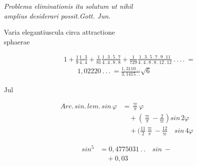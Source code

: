 \clearpage{}\NoSourceHead
\begingroup\fontsize{10}{15}\selectfont\itshape
\noindent Problema eliminationis ita solutum ut nihil\\
\hspace*{2em}amplius desiderari possit.\hfill Gott. Jun.

\medskip
\noindent Varia elegantiuscula circa attractione\\
\hspace*{2em}sphaerae

\medskip
\[
\begin{aligned}
&1+\frac19\frac{1\,.\,3}{4\,.\,4}+\frac1{81}\frac{1\,.\,3\,.\,5\,.\,7}{4\,.\,4\,.\,8\,.\,8}
+\frac1{729}\frac{1\,.\,3\,.\,5\,.\,7\,.\,9\,.\,11}{4\,.\,4\,.\,8\,.\,8\,.\,12\,.\,12}\ .\,.\,.\,.\ =\\
&\qquad1{,}02220\ .\,.\,.\ =\frac{1{,}3110\ .\,.}{3{,}1415\ .\,.}\surd6
\end{aligned}
\]
\par\noindent\hfill Jul

\medskip
\[
\begin{aligned}
\mathit{Arc.\,sin.\,lem.}\,\mathit{sin}\,\varphi
&=\frac\varpi\pi\varphi\\
&\quad+\left(\frac\varpi\pi-\frac2\varpi\right)\mathit{sin}\,2\varphi\\
&\quad+\biggl(\frac{11}2\frac\varpi\pi-\frac{12}\varpi\quad\mathit{sin}\,4\varphi
\end{aligned}
\]

\medskip
\[
\begin{aligned}
\mathit{sin}^{5}&=0{,}4775031\ .\,.\quad\mathit{sin}\ -\\
&\quad+0{,}03
\end{aligned}
\]
\endgroup

